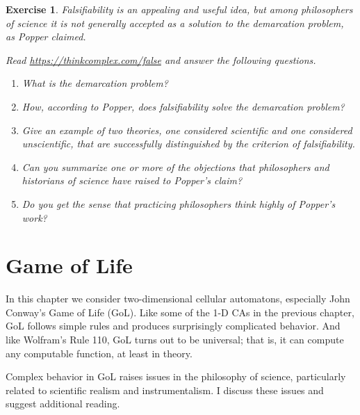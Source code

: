 \documentclass[12pt]{book}
\theoremstyle{exercise}
\newtheorem{exercise}{Exercise}[chapter]
\begin{document}
\begin{exercise}

Falsifiability is an appealing and useful idea, but among philosophers of science it is not generally accepted as a solution to the demarcation problem, as Popper claimed.

Read \url{https://thinkcomplex.com/false} and answer the
following questions.

\begin{enumerate}

\item What is the demarcation problem?


\item How, according to Popper, does falsifiability solve the
demarcation problem?

\item Give an example of two theories, one considered scientific
and one considered unscientific, that are successfully distinguished
by the criterion of falsifiability.

\item Can you summarize one or more of the objections that
philosophers and historians of science have raised to Popper's
claim?

\item Do you get the sense that practicing philosophers think
highly of Popper's work?

\end{enumerate}

\end{exercise}




\chapter{Game of Life}
\label{lifechap}

In this chapter we consider two-dimensional cellular automatons,
especially John Conway's Game of Life (GoL).  Like some of
the 1-D CAs in the previous chapter, GoL follows simple rules and
produces surprisingly complicated behavior.  And like Wolfram's
Rule 110, GoL turns out to be universal; that is, it can compute
any computable function, at least in theory.


Complex behavior in GoL raises issues in the philosophy of
science, particularly related to scientific realism and instrumentalism.
I discuss these issues and suggest additional reading.
\end{document}
